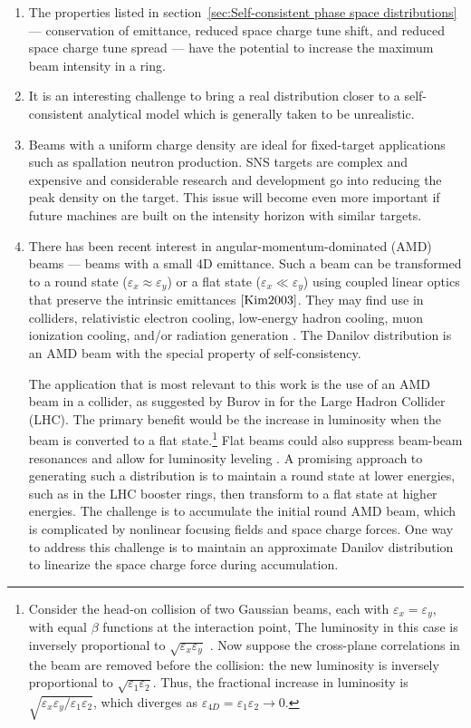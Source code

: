 \begin{enumerate}
\item 
The properties listed in section~\ref{sec:Self-consistent phase space distributions} — conservation of emittance, reduced space charge tune shift, and reduced space charge tune spread — have the potential to increase the maximum beam intensity in a ring.

\item
It is an interesting challenge to bring a real distribution closer to a self-consistent analytical model which is generally taken to be unrealistic. 

\item
Beams with a uniform charge density are ideal for fixed-target applications such as spallation neutron production. SNS targets are complex and expensive \cite{Haines2014} and considerable research and development go into reducing the peak density on the target. This issue will become even more important if future machines are built on the intensity horizon with similar targets.

\item
There has been recent interest in angular-momentum-dominated (AMD) beams — beams with a small 4D emittance. Such a beam can be transformed to a round state ($\varepsilon_x \approx \varepsilon_y$) or a flat state ($\varepsilon_x \ll \varepsilon_y$) using coupled linear optics that preserve the intrinsic emittances $\cite{Kim2003}$. They may find use in colliders, relativistic electron cooling, low-energy hadron cooling, muon ionization cooling, and/or radiation generation \cite{Burov2002}. The Danilov distribution is an AMD beam with the special property of self-consistency.

The application that is most relevant to this work is the use of an AMD beam in a collider, as suggested by Burov in \cite{Burov2013} for the Large Hadron Collider (LHC). The primary benefit would be the increase in luminosity when the beam is converted to a flat state.\footnote{Consider the head-on collision of two Gaussian beams, each with $\varepsilon_x = \varepsilon_y$, with equal $\beta$ functions at the interaction point, The luminosity in this case is inversely proportional to $\sqrt{\varepsilon_x \varepsilon_y}$ \cite{Herr2006}. Now suppose the cross-plane correlations in the beam are removed before the collision: the new luminosity is inversely proportional to $\sqrt{\varepsilon_1 \varepsilon_2}$. Thus, the fractional increase in luminosity is $\sqrt{{\varepsilon_x\varepsilon_y} / {\varepsilon_1\varepsilon_2}}$, which diverges as $\varepsilon_{4D} = \varepsilon_1\varepsilon_2 \rightarrow 0$.} Flat beams could also suppress beam-beam resonances and allow for luminosity leveling \cite{Burov2013}. A promising approach to generating such a distribution is to maintain a round state at lower energies, such as in the LHC booster rings, then transform to a flat state at higher energies. The challenge is to accumulate the initial round AMD beam, which is complicated by nonlinear focusing fields and space charge forces. One way to address this challenge is to maintain an approximate Danilov distribution to linearize the space charge force during accumulation. 
\end{enumerate}

